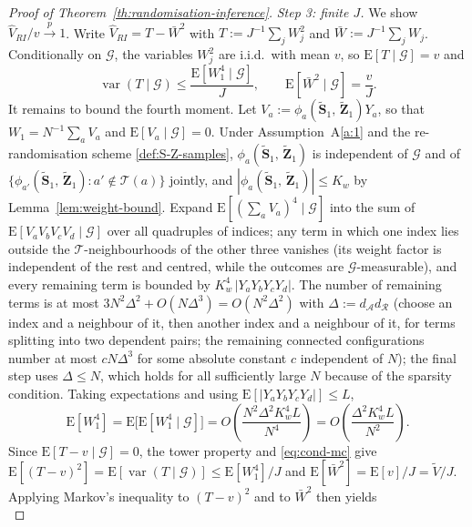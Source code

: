\documentclass[sigconf]{acmart}
\newcommand{\E}{\mathrm E}
\DeclareMathOperator{\var}{var}
\begin{document}
\begin{proof}[Proof of Theorem~\ref{th:randomisation-inference}]
    \emph{Step 3: finite $J$.} We show $\hat V_{RI}/v\stackrel{p}{\to}1$. Write $\hat V_{RI} = T - \bar W^2$ with $T := J^{-1}\sum_j W_j^2$ and $\bar W := J^{-1}\sum_jW_j$. Conditionally on $\mathcal G$, the variables $W_j^2$ are i.i.d.\ with mean $v$, so $\E[T\mid\mathcal G] = v$ and
    \begin{equation}\label{eq:cond-mc}
        \var\left(T\mid \mathcal G\right) \le \frac{\E[W_1^4\mid\mathcal G]}{J},\qquad \E[\bar W^2\mid \mathcal G] = \frac vJ.
    \end{equation}
    It remains to bound the fourth moment. Let $V_a := \phi_a(\tilde{\mathbf S}_1,\,\tilde{\mathbf Z}_1)Y_a$, so that $W_1 = N^{-1}\sum_aV_a$ and $\E[V_a\mid\mathcal G]=0$. Under Assumption~A\ref{a:1} and the re-randomisation scheme \eqref{def:S-Z-samples}, $\phi_a(\tilde{\mathbf S}_1,\,\tilde{\mathbf Z}_1)$ is independent of $\mathcal G$ and of $\{\phi_{a'}(\tilde{\mathbf S}_1,\,\tilde{\mathbf Z}_1)\colon a'\notin\mathcal T(a)\}$ jointly, and $|\phi_a(\tilde{\mathbf S}_1,\,\tilde{\mathbf Z}_1)|\le K_w$ by Lemma~\ref{lem:weight-bound}. Expand $\E[(\sum_aV_a)^4\mid\mathcal G]$ into the sum of $\E[V_aV_bV_cV_d\mid\mathcal G]$ over all quadruples of indices; any term in which one index lies outside the $\mathcal T$-neighbourhoods of the other three vanishes (its weight factor is independent of the rest and centred, while the outcomes are $\mathcal G$-measurable), and every remaining term is bounded by $K_w^4\,|Y_aY_bY_cY_d|$. The number of remaining terms is at most $3N^2\Delta^2 + O(N\Delta^3) = O(N^2\Delta^2)$ with $\Delta := d_{\mathcal A}d_{\mathcal R}$ (choose an index and a neighbour of it, then another index and a neighbour of it, for terms splitting into two dependent pairs; the remaining connected configurations number at most $cN\Delta^3$ for some absolute constant $c$ independent of $N$); the final step uses $\Delta\le N$, which holds for all sufficiently large $N$ because of the sparsity condition. Taking expectations and using $\E[|Y_aY_bY_cY_d|]\le L$,
    \begin{equation*}
        \E[W_1^4] = \E\bigl[\E[W_1^4\mid \mathcal G]\bigr] = O\left(\frac{N^2\Delta^2 K_w^4L}{N^4}\right) = O\left(\frac{\Delta^2K_w^4L}{N^2}\right).
    \end{equation*}
    Since $\E[T-v\mid\mathcal G]=0$, the tower property and \eqref{eq:cond-mc} give $\E[(T-v)^2] = \E[\var(T\mid\mathcal G)]\le \E[W_1^4]/J$ and $\E[\bar W^2] = \E[v]/J = \tilde V/J$. Applying Markov's inequality to $(T-v)^2$ and to $\bar W^2$ then yields
    \begin{equation*}

\end{equation*}
\end{proof}
\end{document}
